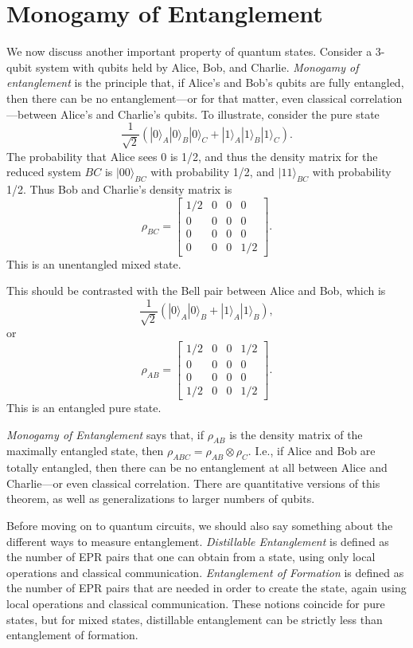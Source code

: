 \documentclass[11pt]{report}
\theoremstyle{plain}
\theoremstyle{definition}
\renewcommand{\ket}[1]{|#1\rangle}
\begin{document}
\section{Monogamy of Entanglement}

We now discuss another important property of quantum states. Consider a 3-qubit system with qubits held by Alice, Bob, and Charlie.
\emph{Monogamy of entanglement} is the principle that, if Alice's and Bob's qubits are fully entangled,
then there can be no entanglement---or for that matter, even classical correlation---between
Alice's and Charlie's qubits.  To illustrate, consider the pure state
$$\frac{1}{\sqrt{2}}(\ket{0}_A\ket{0}_B\ket{0}_C + \ket{1}_A\ket{1}_B\ket{1}_C).$$
The probability that Alice sees 0 is 1/2, and thus the density matrix
for the reduced system $BC$ is $\ket{00}_{BC}$ with probability 1/2,
and $\ket{11}_{BC}$ with probability 1/2.
Thus Bob and Charlie's density matrix is
$$\rho_{BC} = \begin{bmatrix}
1/2 & 0 & 0 & 0 \\
0 & 0 & 0 & 0 \\
0 & 0 & 0 & 0 \\
0 & 0 & 0 & 1/2
\end{bmatrix}.$$
This is an unentangled mixed state.

This should be contrasted with the Bell pair between
Alice and Bob, which is
$$\frac{1}{\sqrt{2}}(\ket{0}_A\ket{0}_B + \ket{1}_A\ket{1}_B),$$
or
$$\rho_{AB} = \begin{bmatrix}
1/2 & 0 & 0 & 1/2 \\
0 & 0 & 0 & 0 \\
0 & 0 & 0 & 0 \\
1/2 & 0 & 0 & 1/2
\end{bmatrix}.$$
This is an entangled pure state.

{\em Monogamy of Entanglement} says that, if $\rho_{AB}$ is the density matrix
of the maximally entangled state, then $\rho_{ABC} = \rho_{AB} \otimes \rho_C$.
I.e., if Alice and Bob are totally entangled, then there can be no entanglement
at all between Alice and Charlie---or even classical correlation.  There are quantitative versions of this theorem, as well as
generalizations to larger numbers of qubits.

Before moving on to quantum circuits, we should also say something about the different
ways to measure entanglement.  {\em Distillable Entanglement} is defined as the number of EPR pairs that one can obtain from a state, using only
local operations and classical communication.
{\em Entanglement of Formation} is defined as the number of EPR
pairs that are needed in order to create the state, again using local operations and classical communication.  These notions
coincide for pure states, but for mixed states, distillable entanglement can be strictly less than entanglement of formation.
\end{document}
